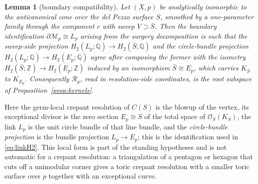 \documentclass[11pt]{amsart}
\newtheorem{lemma}[theorem]{Lemma}
\theoremstyle{definition}
\theoremstyle{remark}
\theoremstyle{plain}
\newcommand{\ZZ}{\mathbb{Z}}
\newcommand{\QQ}{\mathbb{Q}}
\newcommand{\cO}{\mathcal{O}}
\newcommand{\Rsm}{\mathcal{R}}   %
\newcommand{\Mil}{\mathcal{M}}  %
\newcommand{\Sb}{\bar{S}}
\begin{document}
\begin{lemma}[boundary compatibility]\label{lem:boundary}
Let $(X,p)$ be analytically isomorphic to the anticanonical cone over
the del Pezzo surface $S$, smoothed by a one-parameter family through
the component $c$ with sweep $V\supset\Sb$.  Then the boundary
identification $\partial \Mil_p\cong L_p$ arising from the surgery
decomposition is such that the sweep-side projection
$H_2(L_p;\QQ)\to H_2(\Sb;\QQ)$ and the circle-bundle projection
$H_2(L_p;\QQ)\to H_2(E_p;\QQ)$ agree after composing the former with the
isometry $H_2(\Sb;\ZZ)\to H_2(E_p;\ZZ)$ induced by an isomorphism
$\Sb\cong E_p$, which carries $K_{\Sb}$ to $K_{E_p}$.  Consequently $\Rsm_p$,
read in resolution-side coordinates, is the root subspace of
Proposition~\ref{prop:kernels}.
\end{lemma}

Here the germ-local crepant resolution of $C(S)$ is the blowup of the
vertex, its exceptional divisor is the zero section $E_p\cong S$ of the
total space of $\cO_S(K_S)$, the link $L_p$ is the unit circle bundle of
that line bundle, and the \emph{circle-bundle projection} is the bundle
projection $L_p\to E_p$; this is the identification used in
\eqref{eq:linkH2}.  This local form is part of the standing hypotheses and
is not automatic for a crepant resolution: a triangulation of a pentagon or
hexagon that cuts off a unimodular corner gives a toric crepant resolution
with a smaller toric surface over $p$ together with an exceptional curve.
\end{document}
